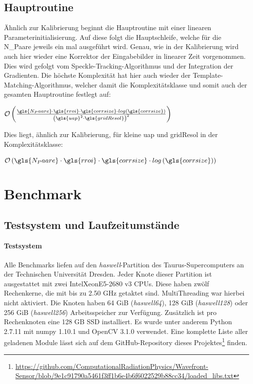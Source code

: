 \subsection{Hauptroutine}

Ähnlich zur Kalibrierung beginnt die Hauptroutine mit einer linearen Parameterinitialisierung. Auf diese folgt die Hauptschleife, welche für die \gls{N_Paare} jeweils ein mal ausgeführt wird. Genau, wie in der Kalibrierung wird auch hier wieder eine Korrektor der Eingabebilder in linearer Zeit vorgenommen. Dies wird gefolgt vom Speckle-Tracking-Algorithmus und der Integration der Gradienten. Die höchste Komplexität hat hier auch wieder der Template-Matching-Algorithmus, welcher damit die Komplexitätsklasse und somit auch der gesamten Hauptroutine festlegt auf:

\begin{center}
	$\mathcal{O}\left(\frac{\gls{N_Paare} \cdot\gls{rroi} \cdot \gls{corrsize} \cdot log\left(\gls{corrsize}\right)}{\left(\gls{uap}^2 \cdot \gls{gridResol}\right)^2}\right)$
\end{center}

Dies liegt, ähnlich zur Kalibrierung, für kleine \gls{uap} und \gls{gridResol} in der Komplexitätsklasse:

\begin{center}
	$\mathcal{O}\left(\gls{N_Paare} \cdot\gls{rroi} \cdot \gls{corrsize} \cdot log\left(\gls{corrsize}\right)\right)$
\end{center}

\section{Benchmark}

\subsection{Testsystem und Laufzeitumstände}

\paragraph{Testsystem}

Alle Benchmarks liefen auf den \textit{haswell}-Partition des Taurus-Supercomputers an der Technischen Universität Dresden. Jeder Knote dieser Partition ist ausgestattet mit zwei Intel\textregistered Xeon\textregistered E5-2680 v3 \glspl{CPU}. Diese haben zwölf Rechenkerne, die mit bis zu 2.50 GHz getaktet sind. MultiThreading war hierbei nicht aktiviert. Die Knoten haben 64 GiB (\textit{haswell64}), 128 GiB (\textit{haswell128}) oder 256 GiB (\textit{haswell256}) Arbeitsspeicher zur Verfügung. Zusätzlich ist pro Rechenknoten eine 128 GB \gls{SSD} installiert. Es wurde unter anderem Python 2.7.11 mit numpy 1.10.1 und OpenCV 3.1.0 verwendet. Eine komplette Liste aller geladenen Module lässt sich auf dem GitHub-Repository dieses Projektes\footnote{\url{https://github.com/ComputationalRadiationPhysics/Wavefront-Sensor/blob/9e1c91790a5461f3ff1b6e4b6f6022529b88cc34/loaded_libs.txt}} finden.

